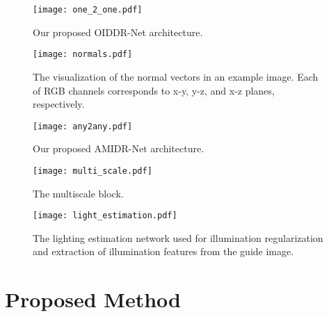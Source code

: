 \documentclass[final]{cvpr}
\newcommand{\squeezeup}{\vspace{-5mm}}
\newcommand{\smallsqueezeup}{\vspace{-2mm}}
\begin{document}
\begin{figure*}
    \centering
    \texttt{[image: one\_2\_one.pdf]}
    \smallsqueezeup
    \caption{Our proposed OIDDR-Net architecture.}
    \label{fig:one_to_one}
\end{figure*}
\begin{figure}
    \centering
    \texttt{[image: normals.pdf]}
    \smallsqueezeup
    \caption{The visualization of the normal vectors in an example image. Each of RGB channels corresponds to x-y, y-z, and x-z planes, respectively.}\squeezeup
    \label{fig:normal}
\end{figure}
\smallsqueezeup
\begin{figure*}
    \centering
    \texttt{[image: any2any.pdf]}
\caption{Our proposed AMIDR-Net architecture.}
    \label{fig:any_to_any}
\end{figure*}
\begin{figure}
    \centering
    \texttt{[image: multi\_scale.pdf]}
    \squeezeup
    \caption{The multiscale block.}
    \label{fig:multiscale}
    \smallsqueezeup
\end{figure}
\begin{figure}
\setlength\belowcaptionskip{-20pt}
    \centering
    \texttt{[image: light\_estimation.pdf]}
    \squeezeup
    \caption{The lighting estimation network used for illumination regularization and extraction of illumination features from the guide image.}
    \label{fig:light_estimation}
\end{figure}
\section{Proposed Method}
\smallsqueezeup
\end{document}
